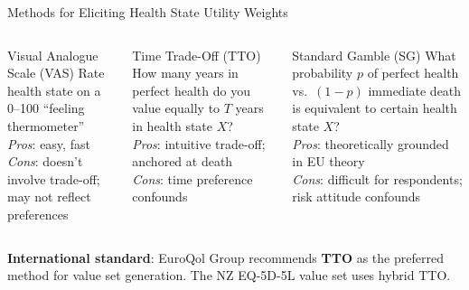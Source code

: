 \documentclass[aspectratio=169, 12pt]{beamer}
\begin{document}
\begin{frame}{Methods for Eliciting Health State Utility Weights}
  \begin{columns}
      \begin{block}{Visual Analogue Scale (VAS)}
        Rate health state on a 0--100 ``feeling thermometer''\\[0.3em]
        \textit{Pros}: easy, fast\\
        \textit{Cons}: doesn't involve trade-off; may not reflect preferences
      \end{block}
      \begin{alertblock}{Time Trade-Off (TTO)}
        How many years in perfect health do you value equally to $T$ years in health state $X$?\\[0.3em]
        \textit{Pros}: intuitive trade-off; anchored at death\\
        \textit{Cons}: time preference confounds
      \end{alertblock}
      \begin{block}{Standard Gamble (SG)}
        What probability $p$ of perfect health vs.\ $(1-p)$ immediate death is equivalent to
        certain health state $X$?\\[0.3em]
        \textit{Pros}: theoretically grounded in EU theory\\
        \textit{Cons}: difficult for respondents; risk attitude confounds
      \end{block}
  \end{columns}
  \vspace{0.4em}
  {\footnotesize \textbf{International standard}: EuroQol Group recommends \textbf{TTO} as the
  preferred method for value set generation. The NZ EQ-5D-5L value set uses hybrid TTO.}
\end{frame}
\end{document}
